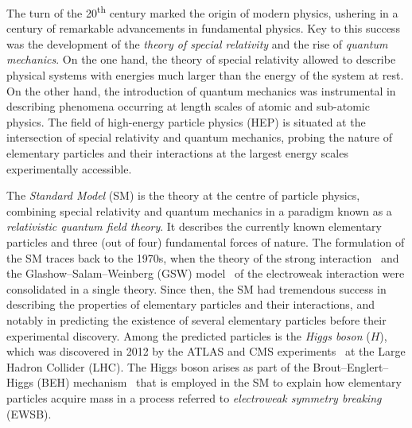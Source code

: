 The turn of the 20\textsuperscript{th} century marked the origin of modern
physics, ushering in a century of remarkable advancements in fundamental
physics. Key to this success was the development of the \emph{theory of special
  relativity} and the rise of \emph{quantum mechanics}. On the one hand, the
theory of special relativity
allowed to describe physical systems with energies much larger than the energy
of the system at rest. On the other hand, the introduction of quantum mechanics
was instrumental in describing phenomena occurring at length scales of atomic
and sub-atomic physics. The field of high-energy particle physics (HEP) is
situated at the intersection of special relativity and quantum mechanics,
probing the nature of elementary particles and their interactions at the largest
energy scales experimentally accessible.

The \emph{Standard Model} (SM) is the theory at the centre of particle physics,
combining special relativity and quantum mechanics in a paradigm known as a
\emph{relativistic quantum field theory}. It describes the currently known
elementary particles and three (out of four) fundamental forces of nature. The
formulation of the SM traces back to the 1970s, when the theory of the strong
interaction~\cite{Fritzsch:1973pi,Gross:1973id,Politzer:1973fx}
and the Glashow--Salam--Weinberg (GSW)
model~\cite{Glashow:1961tr,Salam:1964ry,Weinberg:1967tq} of the electroweak
interaction were consolidated in a single theory. Since then, the SM had
tremendous success in describing the properties of elementary particles and
their interactions, and notably in predicting the existence of several
elementary particles before their experimental discovery. Among the predicted
particles is the \emph{Higgs boson} ($H$), which was discovered in 2012 by the
ATLAS and CMS experiments~\cite{HIGG-2012-27,CMS-HIG-12-028} at the Large Hadron
Collider (LHC). The Higgs boson arises as part of the Brout--Englert--Higgs
(BEH) mechanism~\cite{Englert:1964et,Higgs:1964pj}
that is employed in the SM to explain how elementary
particles acquire mass in a process referred to \emph{electroweak symmetry
  breaking} (EWSB).
%
%

